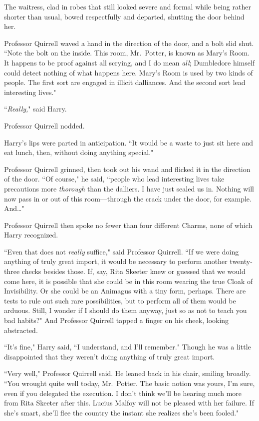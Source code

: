 The waitress, clad in robes that still looked severe and formal while being rather shorter than usual, bowed respectfully and departed, shutting the door behind her.

Professor Quirrell waved a hand in the direction of the door, and a bolt slid shut. ``Note the bolt on the inside. This room, Mr.~Potter, is known as Mary's Room. It happens to be proof against all scrying, and I do mean \emph{all}; Dumbledore himself could detect nothing of what happens here. Mary's Room is used by two kinds of people. The first sort are engaged in illicit dalliances. And the second sort lead interesting lives."

``\emph{Really,}" said Harry.

Professor Quirrell nodded.

Harry's lips were parted in anticipation. ``It would be a waste to just sit here and eat lunch, then, without doing anything special."

Professor Quirrell grinned, then took out his wand and flicked it in the direction of the door. ``Of course," he said, ``people who lead interesting lives take precautions more \emph{thorough} than the dalliers. I have just sealed us in. Nothing will now pass in or out of this room---through the crack under the door, for example. And{\ldots}"

Professor Quirrell then spoke no fewer than four different Charms, none of which Harry recognized.

``Even that does not \emph{really} suffice," said Professor Quirrell. ``If we were doing anything of truly great import, it would be necessary to perform another twenty-three checks besides those. If, say, Rita Skeeter knew or guessed that we would come here, it is possible that she could be in this room wearing the true Cloak of Invisibility. Or she could be an Animagus with a tiny form, perhaps. There are tests to rule out such rare possibilities, but to perform all of them would be arduous. Still, I wonder if I should do them anyway, just so as not to teach you bad habits?" And Professor Quirrell tapped a finger on his cheek, looking abstracted.

``It's fine," Harry said, ``I understand, and I'll remember." Though he was a little disappointed that they weren't doing anything of truly great import.

``Very well," Professor Quirrell said. He leaned back in his chair, smiling broadly. ``You wrought quite well today, Mr.~Potter. The basic notion was yours, I'm sure, even if you delegated the execution. I don't think we'll be hearing much more from Rita Skeeter after this. Lucius Malfoy will not be pleased with her failure. If she's smart, she'll flee the country the instant she realizes she's been fooled."

